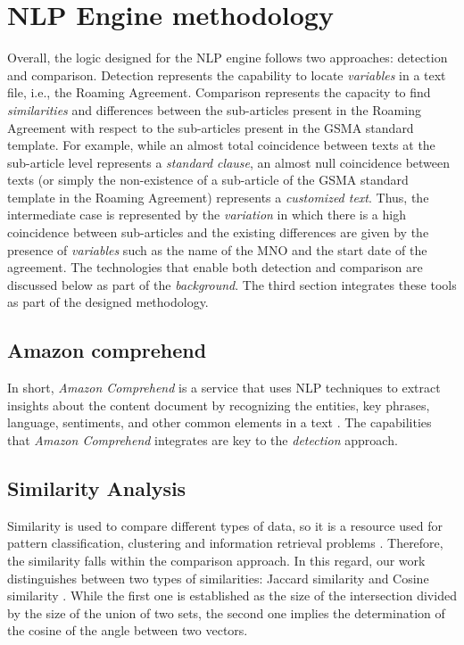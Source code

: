 \documentclass[conference]{style/IEEEtran}
\begin{document}
\section{NLP Engine methodology}
Overall, the logic designed for the NLP engine follows two approaches: detection and comparison. Detection represents the capability to locate \textit{variables} in a text file, i.e., the Roaming Agreement. Comparison represents the capacity to find \textit{similarities} and differences between the sub-articles present in the Roaming Agreement with respect to the sub-articles present in the GSMA standard template. For example, while an almost total coincidence between texts at the sub-article level represents a \textit{standard clause}, an almost null coincidence between texts (or simply the non-existence of a sub-article of the GSMA standard template in the Roaming Agreement) represents a \textit{customized text}. Thus, the intermediate case is represented by the \textit{variation} in which there is a high coincidence between sub-articles and the existing differences are given by the presence of \textit{variables} such as the name of the MNO and the start date of the agreement. The technologies that enable both detection and comparison are discussed below as part of the \textit{background}. The third section integrates these tools as part of the designed methodology.

\subsection{Amazon comprehend}
In short, \textit{Amazon Comprehend} is a service that uses NLP techniques to extract insights about the content document by recognizing  the  entities,  key  phrases,  language,  sentiments,  and  other  common  elements  in  a  text \cite{b11}. The capabilities that \textit{Amazon Comprehend} integrates are key to the \textit{detection} approach.

\subsection{Similarity Analysis}
Similarity is used to compare different types of data, so it is a resource used for pattern classification, clustering and information retrieval problems \cite{b12}. Therefore, the similarity falls within the comparison approach. In this regard, our work distinguishes between two types of similarities: Jaccard similarity and Cosine similarity \cite{b13}. While the first one is established as the size of the intersection divided by the size of the union of two sets, the second one implies the determination of the cosine of the angle between two vectors.
\end{document}
